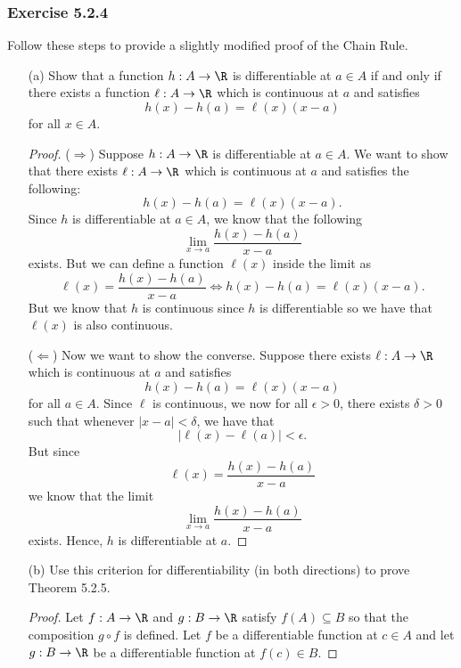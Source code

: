 \subsubsection{Exercise 5.2.4} Follow these steps to provide a slightly modified proof of the Chain Rule.
\begin{enumerate}
    \item[(a)] Show that a function \( h: A \to \R  \) is differentiable at \( a \in A  \) if and only if there exists a function \( \ell : A \to \R  \) which is continuous at \( a  \) and satisfies 
        \[  h(x)  - h(a) = \ell (x) (x - a)  \] for all \( x \in A  \).
        \begin{proof}
            (\( \Rightarrow \)) Suppose \( h: A \to \R  \) is differentiable at \( a \in A \). We want to show that there exists \( \ell: A \to \R  \) which is continuous at \( a  \) and satisfies the following: 
            \[  h(x) - h(a) = \ell (x) (x - a ). \]
            Since \( h  \) is differentiable at \( a \in  A  \), we know that the following 
            \[  \lim_{ x \to a } \frac{ h(x) - h(a) }{ x - a  }  \]
            exists. But we can define a function \(  \ell(x) \) inside the limit as
            \[  \ell(x) = \frac{ h(x) - h(a)  }{ x - a  } \iff h(x) - h(a) = \ell (x) (x -a) . \]
            But we know that \(  h  \) is continuous since \( h \) is differentiable so we have that \( \ell(x)  \) is also continuous. 

            (\( \Leftarrow \)) Now we want to show the converse. Suppose there exists \( \ell : A \to \R  \) which is continuous at \( a  \) and satisfies
            \[  h(x) - h(a) = \ell(x) (x - a )  \] for all \( a \in A  \). Since \( \ell  \) is continuous, we now for all \( \epsilon > 0  \), there exists \( \delta > 0  \) such that whenever \( | x - a  | < \delta  \), we have that 
            \[  | \ell(x) - \ell(a)  | < \epsilon \tag{1}. \]
            But since 
            \[  \ell (x) = \frac{ h(x) - h(a) }{ x - a  }  \]
            we know that the limit 
            \[  \lim_{ x \to a } \frac{ h(x) - h(a)  }{ x - a  }  \] exists. Hence, \( h  \) is differentiable at \( a  \).
        \end{proof}
    \item[(b)] Use this criterion for differentiability (in both directions) to prove Theorem 5.2.5.

        \begin{proof}
        Let \( f: A \to \R  \) and \( g: B \to \R  \) satisfy \( f(A) \subseteq B  \) so that the composition \( g \circ f  \) is defined. Let \( f  \) be a differentiable function at \( c \in  A \) and let \( g: B \to \R  \) be a differentiable function at \(  f(c) \in B  \). 


\end{proof}
\end{enumerate}
